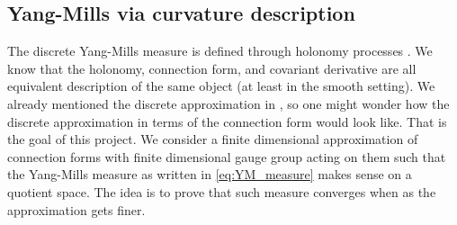 \documentclass[11pt]{article}
\numberwithin{equation}{section}
\theoremstyle{definition}
\theoremstyle{remark}
\newcommand{\1}{\mathbf 1}
\newcommand{\<}{\langle}
\renewcommand{\>}{\rangle}
\begin{document}










\subsection{Yang-Mills via curvature description}
The discrete Yang-Mills measure is defined through holonomy processes \cite{Levy03}. We know that the holonomy, connection form, and covariant derivative are all equivalent description of the same object (at least in the smooth setting). We already mentioned the discrete approximation in , so one might wonder how the discrete approximation in terms of the connection form would look like. That is the goal of this project. We consider a finite dimensional approximation of connection forms with finite dimensional gauge group acting on them such that the Yang-Mills measure as written in  \eqref{eq:YM_measure} makes sense on a quotient space. The idea is to prove that such measure converges when as the approximation gets finer. 
\end{document}
